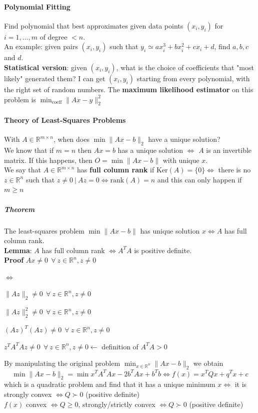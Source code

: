 \documentclass[10pt]{report}
\begin{document}
\paragraph{Polynomial Fitting} Find polynomial that best approximates given data points $(x_i,y_i)$ for $i=1,\ldots,m$ of degree $<n$.\\
An example: given pairs $(x_i, y_i)$ such that $y_i \simeq ax_i^3 + bx_i^2 + cx_i + d$, find $a,b,c$ and $d$.\\
\textbf{Statistical version}: given $(x_i, y_i)$, what is the choice of coefficients that "most likely" generated them? I can get $(x_i, y_i)$ starting from every polynomial, with the right set of random numbers. The \textbf{maximum likelihood estimator} on this problem is $\min_{\text{coeff}}\|Ax - y\|_2^2$
\paragraph{Theory of Least-Squares Problems} With $A \in \mathbb{R}^{m\times n}$, when does $\min \|Ax-b\|_2$ have a unique solution?\\
We know that if $m=n$ then $Ax = b$ has a unique solution $\Leftrightarrow$ $A$ is an invertible matrix. If this happens, then $O = \min\|Ax-b\|$ with unique $x$.\\
We say that $A\in \mathbb{R}^{m\times n}$ has \textbf{full column rank} if $\text{Ker}(A) = \{0\} \Leftrightarrow$ there is no $z\in \mathbb{R}^n$ such that $z\neq 0\:|\:Az=0\Leftrightarrow \text{rank}(A) = n$ and this can only happen if $m\geq n$
\subparagraph{Theorem} The least-squares problem $\min \|Ax-b\|$ has unique solution $x\Leftrightarrow A$ has full column rank.\\
\textbf{Lemma}: $A$ has full column rank $\Leftrightarrow A^TA$ is positive definite.\\
\textbf{Proof} $Ax \neq 0\:\:\forall\:z\in \mathbb{R}^n, z\neq 0$
\begin{list}{$\Leftrightarrow$}{}
	\item $\|Az\|_2 \neq 0\:\:\forall\:z\in \mathbb{R}^n, z\neq 0$
	\item $\|Az\|_2^2 \neq 0\:\:\forall\:z\in \mathbb{R}^n, z\neq 0$
	\item $(Az)^T(Az)\neq 0\:\:\forall\:z\in \mathbb{R}^n, z\neq 0$
	\item $z^TA^TAz\neq 0\:\:\forall\:z\in \mathbb{R}^n, z\neq 0 \longleftarrow$ definition of $A^TA > 0$
\end{list}
By manipulating the original problem $\min_{x\in \mathbb{R}^n} \|Ax-b\|_2$ we obtain $$\min \|Ax-b\|_2 = \min x^TA^TAx - 2b^TAx + b^Tb \Leftrightarrow f(x) = x^TQx + q^Tx + c$$ which is a quadratic problem and find that it has a unique minimum $x \Leftrightarrow$ it is strongly convex $\Leftrightarrow Q \succ 0$ (positive definite)\\
$f(x)$ convex $\Leftrightarrow Q \geq 0$, strongly/strictly convex $\Leftrightarrow Q \succ 0$ (positive definite)
\end{document}

